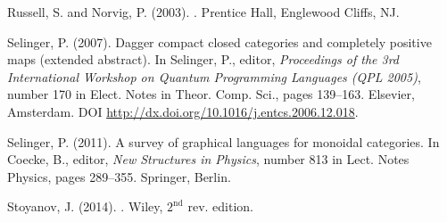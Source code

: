 \documentclass{mscs}
\begin{document}
\begin{thebibliography}{}
Russell, S. and Norvig, P. (2003).
.
\newblock Prentice Hall, Englewood Cliffs, NJ.

Selinger, P. (2007).
\newblock Dagger compact closed categories and completely positive maps
  (extended abstract).
\newblock In Selinger, P., editor, {\em Proceedings of the 3rd International
  Workshop on Quantum Programming Languages (QPL 2005)}, number 170 in Elect.
  Notes in Theor. Comp. Sci., pages 139--163. Elsevier, Amsterdam.
\newblock DOI \url{http://dx.doi.org/10.1016/j.entcs.2006.12.018}.

Selinger, P. (2011).
\newblock A survey of graphical languages for monoidal categories.
\newblock In Coecke, B., editor, {\em New Structures in Physics}, number 813 in
  Lect. Notes Physics, pages 289--355. Springer, Berlin.

Stoyanov, J. (2014).
.
\newblock Wiley, $2^{\textrm{nd}}$ rev. edition.

\end{thebibliography}
\end{document}
